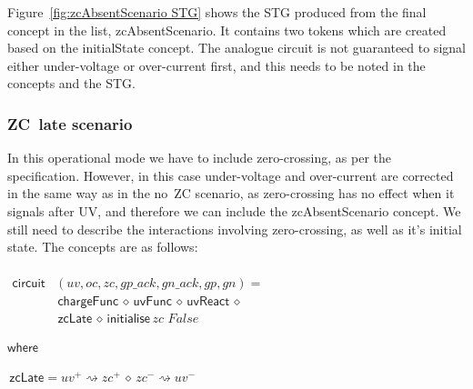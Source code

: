 \documentclass[british,compsoc]{IEEEtran}
\begin{document}

Figure~\ref{fig:zcAbsentScenario STG} shows the STG produced from
the final concept in the list, \textsf{zcAbsentScenario}. It contains
two tokens which are created based on the \textsf{initialState} concept.
The analogue circuit is not guaranteed to signal either under-voltage
or over-current first, and this needs to be noted in the concepts
and the STG.

\subsubsection{ZC~late scenario}

In this operational mode we have to include zero-crossing, as per
the specification. However, in this case under-voltage and over-current
are corrected in the same way as in the no~ZC scenario, as zero-crossing has no effect when it signals after UV, and therefore
we can include the \textsf{zcAbsentScenario} concept. We still need
to describe the interactions involving zero-crossing, as well as it's initial state. The concepts
are as follows:

\begin{minipage}[t]{1\columnwidth}%
\begin{flushleft}
$\begin{aligned}\\\mathsf{circuit}&(uv, oc, zc, gp\_ack, gn\_ack, gp, gn) = \\
& \mathsf{\, chargeFunc}\,\diamond\,\mathsf{uvFunc}\,\diamond\,\mathsf{uvReact}\,\diamond\\
& \,\mathsf{zcLate}\,\diamond\,\mathsf{initialise}\,zc\,\,False
\end{aligned}
$
\par\end{flushleft}%

\par\begin{flushleft}
$\mathsf{where}$
\par\end{flushleft}

\begin{flushleft}
$\,\mathsf{zcLate}=uv^{+}\rightsquigarrow zc^{+}\,\diamond\, zc^{-}\rightsquigarrow uv^{-}$
\par\end{flushleft}

\end{minipage}
\end{document}
